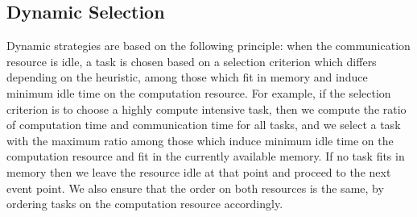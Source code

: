 \documentclass[runningheads]{llncs} %
\begin{document}
\subsection{Dynamic Selection}
Dynamic strategies are based on the following principle: when the communication resource is idle, a task is chosen based on a selection criterion which differs depending on the heuristic, among those which fit in memory and induce minimum idle time on the computation resource.  For example, if the selection criterion is to choose a highly compute intensive task, then we compute the ratio of computation time and communication time for all tasks, and we select a task with the maximum ratio among those which induce minimum idle time on the computation resource and fit in the currently available memory. If no task fits in memory then we leave the resource idle at that point and proceed to the next event point. We also ensure that the order on both resources is the same, by ordering tasks on the computation resource accordingly.



\end{document}
